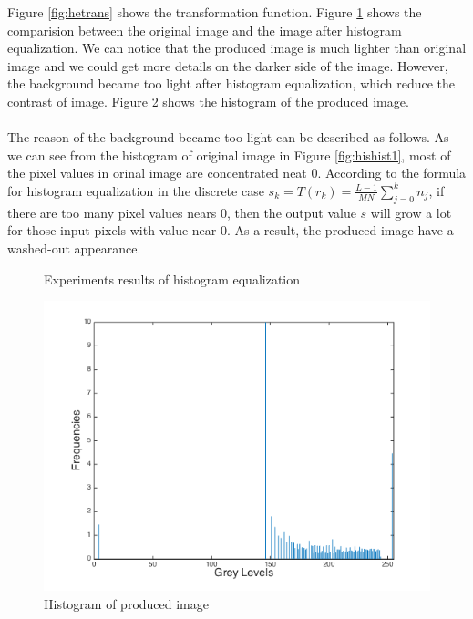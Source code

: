 Figure \ref{fig:hetrans} shows the transformation function. Figure \ref{fig:histeq} shows the comparision between the original image and the image after histogram equalization. We can notice that the produced image is much lighter than original image and we could get more details on the darker side of the image. However, the background became too light after histogram equalization, which reduce the contrast of image. Figure \ref{fig:histnew} shows the histogram of the produced image. \\
\\
The reason of the background became too light can be described as follows. As we can see from the histogram of original image in Figure \ref{fig:hishist1}, most of the pixel values in orinal image are concentrated neat 0. According to the formula for histogram equalization in the discrete case
$ s_k = T(r_k) = \frac{L - 1}{MN}\sum_{j = 0}^{k} n_j $, if there are too many pixel values nears 0, then the output value $s$ will grow a lot for those input pixels with value near 0. As a result, the produced image have a washed-out appearance. 
\begin{figure}[h]
	\centering
	\caption{Experiments results of histogram equalization}
	\label{fig:histeq}
\end{figure}

\begin{figure}[h]
	\centering
	\includegraphics[scale=0.4]{histnew}
	\caption{Histogram of produced image}
	\label{fig:histnew}
\end{figure}
\newpage